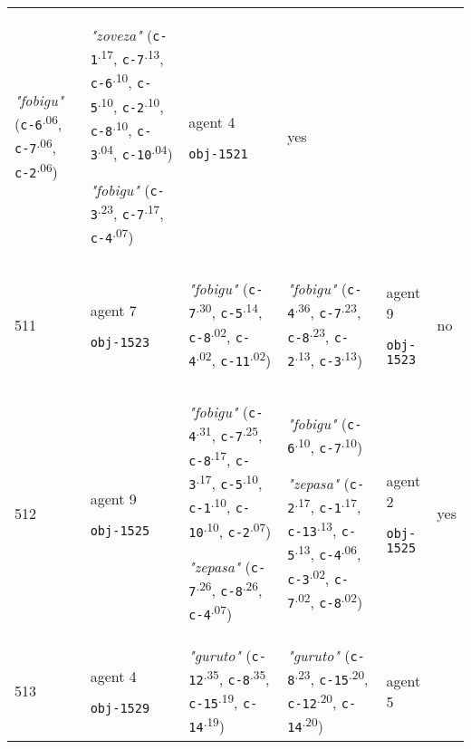 {\begin{tabular}{@{}p{0.3cm}p{0.9cm}p{6cm}p{6cm}p{0.9cm}p{0.55cm}@{}}
\textit{"fobigu"} (\texttt{c-6}\textsuperscript{.06}, \texttt{c-7}\textsuperscript{.06}, \texttt{c-2}\textsuperscript{.06}) & \textit{"zoveza"} (\texttt{c-1}\textsuperscript{.17}, \texttt{c-7}\textsuperscript{.13}, \texttt{c-6}\textsuperscript{.10}, \texttt{c-5}\textsuperscript{.10}, \texttt{c-2}\textsuperscript{.10}, \texttt{c-8}\textsuperscript{.10}, \texttt{c-3}\textsuperscript{.04}, \texttt{c-10}\textsuperscript{.04})

\textit{"fobigu"} (\texttt{c-3}\textsuperscript{.23}, \texttt{c-7}\textsuperscript{.17}, \texttt{c-4}\textsuperscript{.07}) & agent 4 

 \texttt{obj-1521} & yes \\
511 & agent 7 

\texttt{obj-1523} &\textit{"fobigu"} (\texttt{c-7}\textsuperscript{.30}, \texttt{c-5}\textsuperscript{.14}, \texttt{c-8}\textsuperscript{.02}, \texttt{c-4}\textsuperscript{.02}, \texttt{c-11}\textsuperscript{.02}) & \textit{"fobigu"} (\texttt{c-4}\textsuperscript{.36}, \texttt{c-7}\textsuperscript{.23}, \texttt{c-8}\textsuperscript{.23}, \texttt{c-2}\textsuperscript{.13}, \texttt{c-3}\textsuperscript{.13}) & agent 9 

 \texttt{obj-1523} & no \\
512 & agent 9 

\texttt{obj-1525} &\textit{"fobigu"} (\texttt{c-4}\textsuperscript{.31}, \texttt{c-7}\textsuperscript{.25}, \texttt{c-8}\textsuperscript{.17}, \texttt{c-3}\textsuperscript{.17}, \texttt{c-5}\textsuperscript{.10}, \texttt{c-1}\textsuperscript{.10}, \texttt{c-10}\textsuperscript{.10}, \texttt{c-2}\textsuperscript{.07})

\textit{"zepasa"} (\texttt{c-7}\textsuperscript{.26}, \texttt{c-8}\textsuperscript{.26}, \texttt{c-4}\textsuperscript{.07}) & \textit{"fobigu"} (\texttt{c-6}\textsuperscript{.10}, \texttt{c-7}\textsuperscript{.10})

\textit{"zepasa"} (\texttt{c-2}\textsuperscript{.17}, \texttt{c-1}\textsuperscript{.17}, \texttt{c-13}\textsuperscript{.13}, \texttt{c-5}\textsuperscript{.13}, \texttt{c-4}\textsuperscript{.06}, \texttt{c-3}\textsuperscript{.02}, \texttt{c-7}\textsuperscript{.02}, \texttt{c-8}\textsuperscript{.02}) & agent 2 

 \texttt{obj-1525} & yes \\
513 & agent 4 

\texttt{obj-1529} &\textit{"guruto"} (\texttt{c-12}\textsuperscript{.35}, \texttt{c-8}\textsuperscript{.35}, \texttt{c-15}\textsuperscript{.19}, \texttt{c-14}\textsuperscript{.19}) & \textit{"guruto"} (\texttt{c-8}\textsuperscript{.23}, \texttt{c-15}\textsuperscript{.20}, \texttt{c-12}\textsuperscript{.20}, \texttt{c-14}\textsuperscript{.20}) & agent 5 


\end{tabular}}
